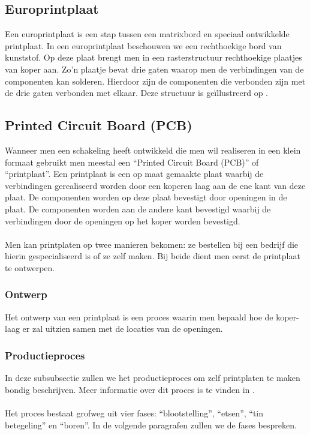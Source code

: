 \subsection{Europrintplaat}
Een europrintplaat is een stap tussen een matrixbord en speciaal ontwikkelde printplaat. In een europrintplaat beschouwen we een rechthoekige bord van kunststof. Op deze plaat brengt men in een rasterstructuur rechthoekige plaatjes van koper aan. Zo'n plaatje bevat drie gaten waarop men de verbindingen van de componenten kan solderen. Hierdoor zijn de componenten die verbonden zijn met de drie gaten verbonden met elkaar. Deze structuur is ge\"illustreerd op .
\subsection{Printed Circuit Board (PCB)}
Wanneer men een schakeling heeft ontwikkeld die men wil realiseren in een klein formaat gebruikt men meestal een ``Printed Circuit Board (PCB)'' of ``printplaat''. Een printplaat is een op maat gemaakte plaat waarbij de verbindingen gerealiseerd worden door een koperen laag aan de ene kant van deze plaat. De componenten worden op deze plaat bevestigt door openingen in de plaat. De componenten worden aan de andere kant bevestigd waarbij de verbindingen door de openingen op het koper worden bevestigd.
\paragraph{}
Men kan printplaten op twee manieren bekomen: ze bestellen bij een bedrijf die hierin gespecialiseerd is of ze zelf maken. Bij beide dient men eerst de printplaat te ontwerpen.
\subsubsection{Ontwerp}
Het ontwerp van een printplaat is een proces waarin men bepaald hoe de koper-laag er zal uitzien samen met de locaties van de openingen.
\subsubsection{Productieproces}
In deze subsubsectie zullen we het productieproces om zelf printplaten te maken bondig beschrijven. Meer informatie over dit proces is te vinden in \cite{fabricatingprintedcircuitboards}.
\paragraph{}
Het proces bestaat grofweg uit vier fases: ``blootstelling'', ``etsen'', ``tin betegeling'' en ``boren''\cite[p. 69]{fabricatingprintedcircuitboards}. In de volgende paragrafen zullen we de fases bespreken.
